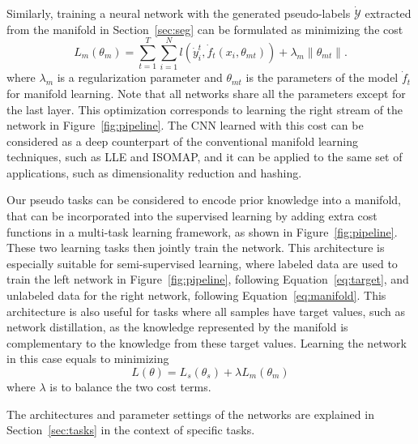 \documentclass{bmvc2k}
\begin{document}
Similarly, training a neural network with the generated pseudo-labels 
$\dot{\mathcal{Y}}$ extracted from the manifold in Section~\ref{sec:seg} can be formulated as minimizing the cost 
\begin{equation}
\label{eq:manifold} 
L_m(\theta_{m}) = \sum_{t=1}^T \sum_{i=1}^N l(\dot{y}_{i}^t, \dot{f}_t(x_i, \theta_{mt}))  + \lambda_m \|\theta_{mt}\|. 
\end{equation}
where $\lambda_m$ is a regularization parameter and $\theta_{mt}$ is the parameters of the model $\dot{f}_t$ for manifold learning. Note that all networks share all the parameters except for the last layer.  
This optimization corresponds to learning the right stream of the 
network in Figure~\ref{fig:pipeline}. The CNN learned with this cost can 
be considered as a deep counterpart of the conventional manifold learning 
techniques, such as LLE and ISOMAP, and it can be applied to the same 
set of applications, such as dimensionality reduction and hashing.   

Our pseudo tasks can be considered to encode prior knowledge into a 
manifold, that can be incorporated into the supervised learning by adding 
extra cost functions in a multi-task learning framework, as shown in 
Figure~\ref{fig:pipeline}. These two learning tasks then jointly train 
the network. This architecture is especially suitable for semi-supervised 
learning, where labeled data are used to train the left network in Figure~\ref{fig:pipeline}, following Equation~\ref{eq:target}, 
and unlabeled data for the right network, following Equation~\ref{eq:manifold}. This architecture is also useful for tasks where 
all samples have target values, such as network distillation, as the knowledge represented by the manifold is 
complementary to the knowledge from these target values. 
Learning the network in this case equals to minimizing 
\begin{equation}
\label{eq:cost} 
L(\theta) =  L_s(\theta_s) + \lambda L_m(\theta_m)
\end{equation}
where $\lambda$ is to balance the two cost terms. 

The architectures and parameter settings of 
the networks are explained in Section~\ref{sec:tasks} in the context of 
specific tasks. 

\end{document}
